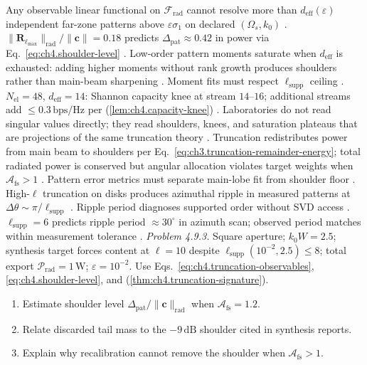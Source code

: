 \label{cor:ch4.observable-rank-sat}
Any observable linear functional on \(\mathcal{F}_{\mathrm{rad}}\) cannot resolve more than \(d_{\mathrm{eff}}(\varepsilon)\) independent far-zone patterns
above \(\varepsilon\sigma_{1}\) on declared \((\Omega_{s},k_{0})\) \cite{stratton1941}.
\(\|\mathbf{R}_{\ell_{\max}}\|_{\mathrm{rad}}/\|\mathbf{c}\|=0.18\) predicts \(\Delta_{\mathrm{pat}}\approx0.42\) in power via Eq.~\eqref{eq:ch4.shoulder-level}
\cite{stratton1941}.
Low-order pattern moments saturate when \(d_{\mathrm{eff}}\) is exhausted: adding higher moments without rank growth produces shoulders rather than main-beam
sharpening \cite{stratton1941}. Moment fits must respect \(\ell_{\mathrm{supp}}\) ceiling
\cite{harrington2001}.
\(N_{\mathrm{el}}=48\), \(d_{\mathrm{eff}}=14\): Shannon capacity knee at stream \(14\)--\(16\); additional streams add \(\le0.3\,\mathrm{bps/Hz}\) per
(\ref{lem:ch4.capacity-knee}) \cite{harrington2001}.
Laboratories do not read singular values directly; they read shoulders, knees, and saturation plateaus that are projections of the same truncation
theory \cite{stratton1941}. 
Truncation redistributes power from main beam to shoulders per Eq.~\eqref{eq:ch3.truncation-remainder-energy}; total radiated power is conserved but
angular allocation violates target weights when \(\mathcal{A}_{\mathrm{fs}}>1\) \cite{stratton1941}.
Pattern error metrics must separate main-lobe fit from shoulder floor \cite{harrington2001}.
High-\(\ell\) truncation on disks produces azimuthal ripple in measured patterns at \(\Delta\theta\sim\pi/\ell_{\mathrm{supp}}\) \cite{stratton1941}. Ripple period diagnoses supported order without SVD access
\cite{harrington2001}.
\(\ell_{\mathrm{supp}}=6\) predicts ripple period \(\approx30^{\circ}\) in azimuth scan; observed period matches within measurement tolerance
\cite{stratton1941}.
\emph{Problem 4.9.3.} Square aperture; $k_{0}W=2.5$; synthesis target forces content at $\ell=10$ despite $\ell_{\mathrm{supp}}(10^{-2},2.5)\le8$; total export $\mathcal{P}_{\mathrm{rad}}=1\,\mathrm{W}$; $\varepsilon=10^{-2}$. Use Eqs.~\eqref{eq:ch4.truncation-observables}, \eqref{eq:ch4.shoulder-level}, and (\ref{thm:ch4.truncation-signature}).
\begin{enumerate}
\item[(a)] Estimate shoulder level $\Delta_{\mathrm{pat}}/\|\mathbf{c}\|_{\mathrm{rad}}$ when $\mathcal{A}_{\mathrm{fs}}=1.2$.
\item[(b)] Relate discarded tail mass to the $-9\,\mathrm{dB}$ shoulder cited in synthesis reports.
\item[(c)] Explain why recalibration cannot remove the shoulder when $\mathcal{A}_{\mathrm{fs}}>1$.
\end{enumerate}
